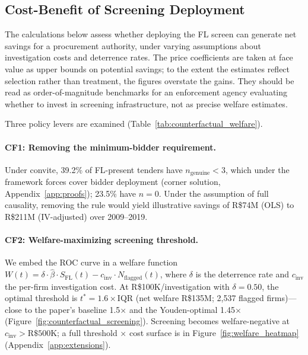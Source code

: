 
\subsection{Cost-Benefit of Screening Deployment}
\label{sec:counterfactual}

The calculations below assess whether deploying the FL screen can
generate net savings for a procurement authority, under varying
assumptions about investigation costs and deterrence rates. The
price coefficients are taken at face value as upper bounds on
potential savings; to the extent the estimates reflect selection
rather than treatment, the figures overstate the gains. They should
be read as order-of-magnitude benchmarks for an enforcement agency
evaluating whether to invest in screening infrastructure, not as
precise welfare estimates.

Three policy levers are examined
(Table~\ref{tab:counterfactual_welfare}).

\paragraph{CF1: Removing the minimum-bidder requirement.}
Under convite, 39.2\% of FL-present tenders have $n_{\text{genuine}}
< 3$, which under the framework forces cover bidder deployment
(corner solution, Appendix~\ref{app:proofs}); 23.5\% have $n = 0$.
Under the assumption of full causality, removing the rule would yield
illustrative savings of R\$74M (OLS) to R\$211M (IV-adjusted) over
2009--2019.

\paragraph{CF2: Welfare-maximizing screening threshold.}
We embed the ROC curve in a welfare function
$W(t) = \delta \cdot \hat{\beta} \cdot S_{\text{FL}}(t) -
c_{\text{inv}} \cdot N_{\text{flagged}}(t)$,
where $\delta$ is the deterrence rate and $c_{\text{inv}}$ the
per-firm investigation cost. At R\$100K/investigation with
$\delta = 0.50$, the optimal threshold is $t^* = 1.6\times$IQR
(net welfare R\$135M; 2,537 flagged firms)---close to the paper's
baseline 1.5$\times$ and the Youden-optimal 1.45$\times$
(Figure~\ref{fig:counterfactual_screening}). Screening becomes
welfare-negative at $c_{\text{inv}} > \text{R\$500K}$; a full
threshold $\times$ cost surface is in
Figure~\ref{fig:welfare_heatmap}
(Appendix~\ref{app:extensions}).

